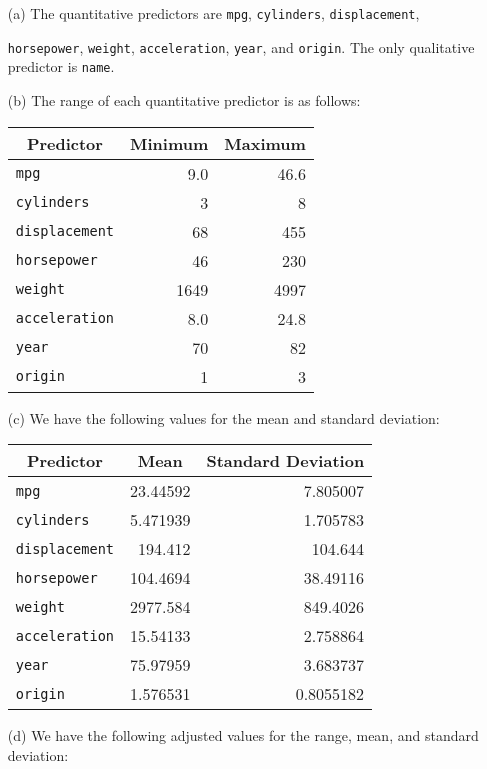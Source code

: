 
\begin{itemize}
    \item[(a)] The quantitative predictors are \verb|mpg|, \verb|cylinders|,
    \verb|displacement|, \par \verb|horsepower|, \verb|weight|, \verb|acceleration|,
    \verb|year|, and \verb|origin|. The only qualitative predictor is \verb|name|.
    \item[(b)] The range of each quantitative predictor is as follows:
    \begin{center}
        \begin{tabular}{ l | r | r }
            \multicolumn{1}{c}{Predictor} & \multicolumn{1}{c}{Minimum} 
            & \multicolumn{1}{c}{Maximum} \\
            \hline
            \verb|mpg| & 9.0 & 46.6 \\
            \verb|cylinders| & 3 & 8 \\
            \verb|displacement| & 68 & 455 \\
            \verb|horsepower| & 46 & 230 \\
            \verb|weight| & 1649 & 4997 \\
            \verb|acceleration| & 8.0 & 24.8 \\
            \verb|year| & 70 & 82 \\
            \verb|origin| & 1 & 3
        \end{tabular}
    \end{center}
    \item[(c)] We have the following values for the mean and standard deviation:
    \begin{center}
        \begin{tabular}{ l | r | r }
            \multicolumn{1}{c}{Predictor} & \multicolumn{1}{c}{Mean} 
            & \multicolumn{1}{c}{Standard Deviation} \\
            \hline
            \verb|mpg| & 23.44592 & 7.805007 \\
            \verb|cylinders| & 5.471939 & 1.705783 \\
            \verb|displacement| & 194.412 & 104.644 \\
            \verb|horsepower| & 104.4694 & 38.49116 \\
            \verb|weight| & 2977.584 & 849.4026 \\
            \verb|acceleration| & 15.54133 & 2.758864 \\
            \verb|year| & 75.97959 & 3.683737 \\
            \verb|origin| & 1.576531 & 0.8055182
        \end{tabular}
    \end{center}
    \item[(d)] We have the following adjusted values for the range, mean, and 
    standard deviation:


\end{itemize}
